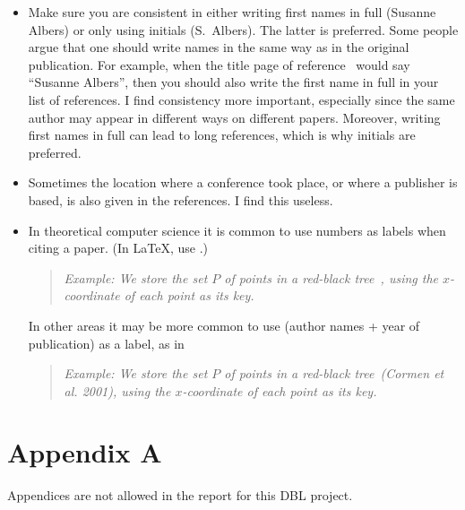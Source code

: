 \documentclass[11pt]{article}
\newcommand{\example}[1]{\begin{quotation} {\sl \noindent Example: #1} \end{quotation}}
\begin{document}
											\begin{itemize}
											\item Make sure you are consistent in either writing first names in full (Susanne Albers)
											or only using initials (S.~Albers). The latter is preferred.
											Some people argue that one should write names in the same way as in
											the original publication. For example, when the title page of reference~\cite{a-raoa-02}
											would say ``Susanne Albers'', then you should also write the first name in full in
											your list of references. I find consistency more important, especially since
											the same author may appear in different ways on different papers. Moreover,
											writing first names in full can lead to long references, which is why
											initials are preferred.
											\item Sometimes the location where a conference took place, or where a publisher is based,
											is also given in the references. I find this useless.
											\item In theoretical computer science it is common to use numbers as labels when citing a paper.
											(In \LaTeX, use \verb##.)
											\example{We store the set $P$ of points in a red-black tree~\cite{clrs-ia-01},
											using the $x$-coordinate of each point as its key.}
											In other areas it may be more
											common to use (author names + year of publication) as a label, as in
									\example{We store the set $P$ of points in a red-black tree~(Cormen et al. 2001),
										using the $x$-coordinate of each point as its key.}

										\end{itemize}

										\section*{Appendix A}
										Appendices are not allowed in the report for this DBL project.

										
\end{document}
